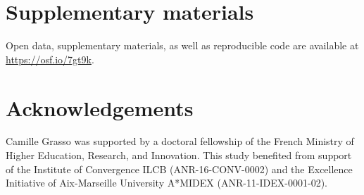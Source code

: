 \documentclass[
  a4paper,12pt,twoside,onecolumn,openright,final,oldfontcommands]{memoir}
\begin{document}
\hypertarget{suppCh3}{%
\section{Supplementary materials}\label{suppCh3}}

Open data, supplementary materials, as well as reproducible code are available at \url{https://osf.io/7gt9k}.

\hypertarget{acknowledgements}{%
\section{Acknowledgements}\label{acknowledgements}}

Camille Grasso was supported by a doctoral fellowship of the French Ministry of Higher Education, Research, and Innovation. This study benefited from support of the Institute of Convergence ILCB (ANR-16-CONV-0002) and the Excellence Initiative of Aix-Marseille University A*MIDEX (ANR-11-IDEX-0001-02).

\newpage
\end{document}
